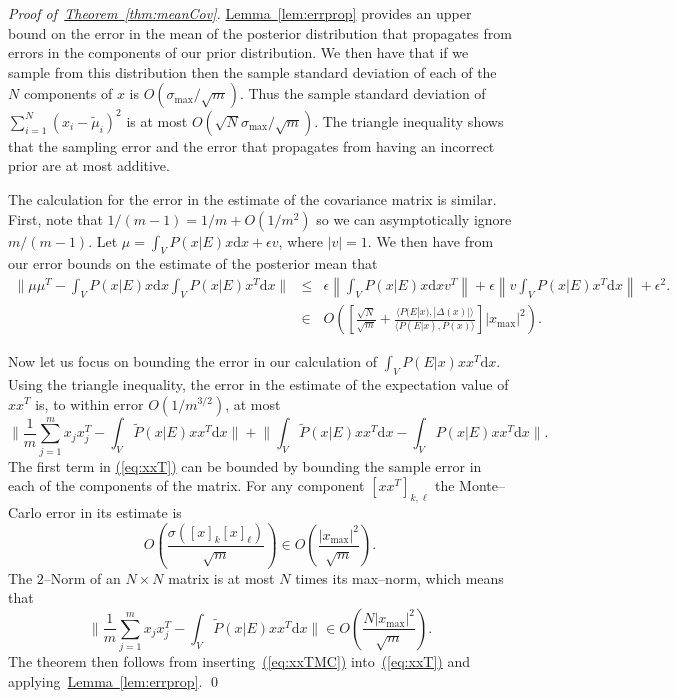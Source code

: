\documentclass[twoside]{article}
\newenvironment{proofof}[1]{\begin{trivlist}\item[]{\flushleft\it
Proof of~#1.}}
{\qed\end{trivlist}}
\newcommand{\eq}[1]{\hyperref[eq:#1]{(\ref*{eq:#1})}}
\newcommand{\thm}[1]{\hyperref[thm:#1]{Theorem~\ref*{thm:#1}}}
\newcommand{\lem}[1]{\hyperref[lem:#1]{Lemma~\ref*{lem:#1}}}
\begin{document}
\begin{proofof}{\thm{meanCov}}
\lem{errprop} provides an upper bound on the error in the mean of the posterior distribution that propagates from errors in the components of our prior distribution.  We then have that if we sample from this distribution then the sample standard deviation of each of the $N$ components of $x$ is $O(\sigma_{\max}/\sqrt{m})$.  Thus the sample standard deviation of $\sum_{i=1}^N (x_i-\tilde{\mu}_i)^2$ is at most $O(\sqrt{N}\sigma_{\max}/\sqrt{m})$.  The triangle inequality shows that the sampling error and the error that propagates from having an incorrect prior are at most additive. 

 The calculation for the error in the estimate of the covariance matrix is similar.  First, note that $1/(m-1)= 1/m +O(1/m^2)$ so we can asymptotically ignore $m/(m-1)$.  Let $\mu = \int_V P(x|E) x\mathrm{d}x +\epsilon v$, where $|v|=1$.  We then have from our error bounds on the estimate of the posterior mean that
\begin{eqnarray}
\| \mu\mu^T - \int_V P(x|E) x\mathrm{d}x \int_V P(x|E) x^T\mathrm{d}x \|&\le& \epsilon \left\|\int_V P(x|E) x\mathrm{d}x v^T\right\|+\epsilon\left\|v\int_V  P(x|E) x^T\mathrm{d}x\right\| + \epsilon^2.\nonumber\\
&\in&  O\left(\left[\frac{\sqrt{N}}{\sqrt{m}} +\frac{\langle P(E|x), |\Delta(x)|\rangle}{\langle P(E|x),P(x)\rangle}\right]|x_{\max}|^2\right).
\end{eqnarray}

Now let us focus on bounding the error in our calculation of $\int_V P(E|x) xx^T \mathrm{d}x$. Using the triangle inequality, the error in the estimate of the expectation value of $x x^T$ is, to within error $O(1/m^{3/2})$, at most
\begin{equation}
\Biggr\|\frac{1}{m} \sum_{j=1}^m x_j x_j^T - \int_V \tilde{P}(x|E) x x^T\mathrm{d}x\Biggr\|+\Biggr\| \int_V \tilde{P}(x|E) x x^T\mathrm{d}x-\int_V {P}(x|E) x x^T\mathrm{d}x\Biggr\|.\label{eq:xxT}
\end{equation}
The first term in \eq{xxT} can be bounded by bounding the sample error in each of the components of the matrix.  For any component $[xx^T]_{k,\ell}$ the Monte--Carlo error in its estimate is
\begin{equation}
O\left(\frac{\sigma({[x]_k[x]_\ell})}{\sqrt{m}}\right)\in O\left(\frac{|x_{\max}|^2}{\sqrt{m}}\right).
\end{equation}
The $2$--Norm of an $N\times N$ matrix is at most $N$ times its max--norm, which means that
\begin{equation}
\Biggr\|\frac{1}{m} \sum_{j=1}^m x_j x_j^T - \int_V \tilde{P}(x|E) x x^T\mathrm{d}x\Biggr\|\in O\left(\frac{N|x_{\max}|^2}{\sqrt{m}}\right).\label{eq:xxTMC}
\end{equation}
The theorem then follows from inserting~\eq{xxTMC} into~\eq{xxT} and applying~\lem{errprop}.
\end{proofof}
\end{document}

